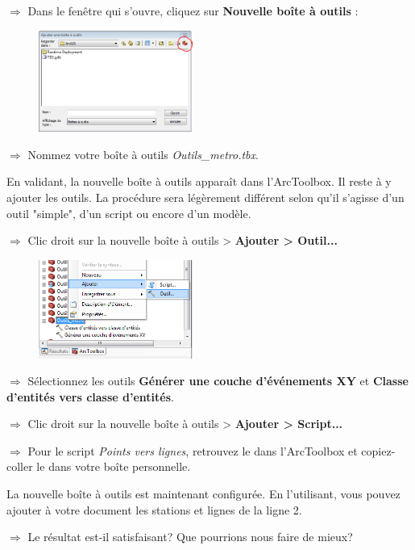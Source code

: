 \documentclass[11pt]{article}
\newcommand{\action}{$\Rightarrow$ }
\begin{document}
\action Dans le fenêtre qui s'ouvre, cliquez sur \textbf{Nouvelle boîte à outils} :
\begin{figure}[H]
	\center \includegraphics[width=0.45\textwidth]{img/td3/arctoolbox_ajouter-2.png}\\
\end{figure}

\action Nommez votre boîte à outils \textit{Outils\_metro.tbx}.

En validant, la nouvelle boîte à outils apparaît dans l'ArcToolbox. Il reste à y ajouter les outils. La procédure sera légèrement différent selon qu'il s'agisse d'un outil "simple", d'un script ou encore d'un modèle.

\action Clic droit sur la nouvelle boîte à outils > \textbf{Ajouter > Outil...}
\begin{figure}[H]
	\center \includegraphics[width=0.45\textwidth]{img/td3/arctoolbox_ajouter-3.png}\\
\end{figure}

\action Sélectionnez les outils \textbf{Générer une couche d'événements XY} et \textbf{Classe d'entités vers classe d'entités}.

\action Clic droit sur la nouvelle boîte à outils > \textbf{Ajouter > Script...}

\action Pour le script \textit{Points vers lignes}, retrouvez le dans l'ArcToolbox et copiez-coller le dans votre boîte personnelle.

La nouvelle boîte à outils est maintenant configurée. En l'utilisant, vous pouvez ajouter à votre document les stations et lignes de la ligne 2.

\action Le résultat est-il satisfaisant? Que pourrions nous faire de mieux?  
\end{document}
